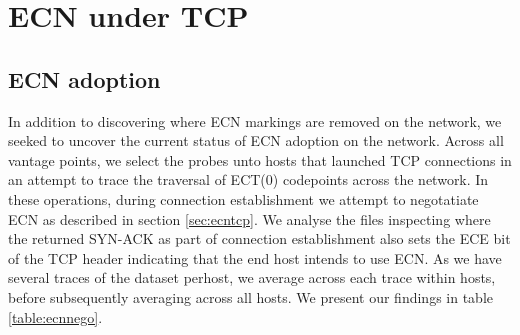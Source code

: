 \documentclass{l4proj}
\begin{document}
\section{ECN under TCP}

\subsection{ECN adoption}

In addition to discovering where ECN markings are removed on the network, we seeked to uncover the current status of ECN adoption on the network. Across all vantage points, we select the probes unto hosts that launched TCP connections in an attempt to trace the traversal of ECT(0) codepoints across the network. In these operations, during connection establishment we attempt to negotatiate ECN as described in section \ref{sec:ecntcp}. We analyse the files inspecting where the returned SYN-ACK as part of connection establishment also sets the ECE bit of the TCP header indicating that the end host intends to use ECN. As we have several traces of the dataset perhost, we average across each trace within hosts, before subsequently averaging across all hosts. We present our findings in table \ref{table:ecnnego}.

\begin{table}[H]
\centering

\caption{Percentage of hosts willing to negotiate ECN by Host sample and IP version utilised. We notice no appreciable difference in ECN adoption between host samples, and a slight increase between IPv4 hosts to IPv6 hosts of the same host sample.}
\label{table:ecnnego}
\end{table}
\end{document}
